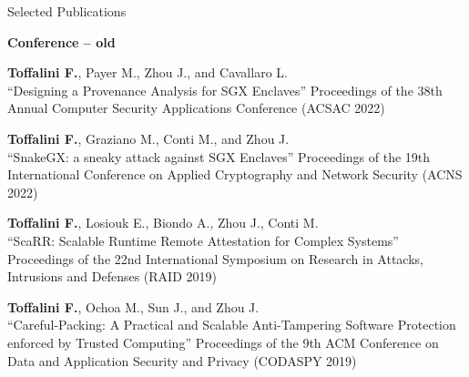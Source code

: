 \documentclass{resume} %
\begin{document}
\begin{rSection}{Selected Publications}






\textbf{Conference -- old}

\begin{enumerate}[label={[C\arabic*]},leftmargin=5mm]
	\item \textbf{Toffalini F.}, Payer M., Zhou J., and Cavallaro
	L.\\``Designing a Provenance Analysis for SGX Enclaves'' Proceedings of the
	38th Annual Computer Security Applications Conference (ACSAC 2022)
	\item \textbf{Toffalini F.}, Graziano M., Conti M., and Zhou J.\\``SnakeGX:
a sneaky attack against SGX Enclaves'' Proceedings of the 19th International
Conference on Applied Cryptography and Network Security (ACNS 2022)
	\item \textbf{Toffalini F.}, Losiouk E., Biondo A., Zhou J., Conti
	M.\\``ScaRR: Scalable Runtime Remote Attestation for Complex Systems''
	Proceedings of the 22nd International Symposium on Research in Attacks,
	Intrusions and Defenses (RAID 2019)
	\item\textbf{Toffalini F.}, Ochoa M., Sun J., and Zhou J.\\ ``Careful-Packing:
	A Practical and Scalable Anti-Tampering Software Protection enforced by
	Trusted Computing'' Proceedings of the 9th ACM Conference on Data and
	Application Security and Privacy (CODASPY 2019)
\end{enumerate}


\end{rSection}
\end{document}
